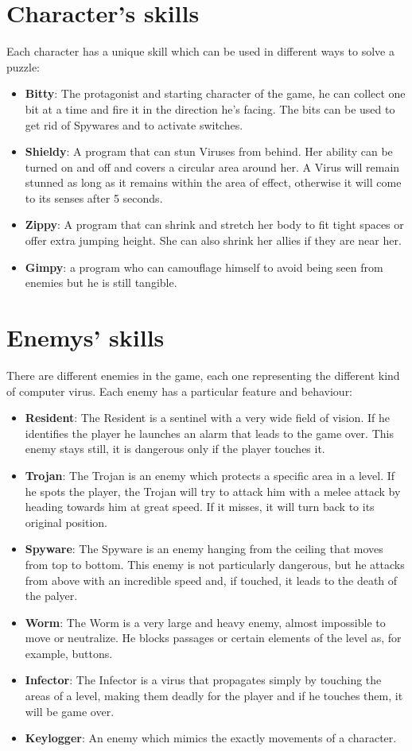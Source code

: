 \documentclass[12pt, a4paper]{report}
\begin{document}
\section*{Character’s skills}
Each character has a unique skill which can be used in different ways to solve a puzzle:
\begin{itemize}
	\item \textbf{Bitty}: The protagonist and starting character of the game, he can collect one bit at a time and fire it in the direction he’s facing. The bits can be used to get rid of Spywares and to activate switches.
	\item \textbf{Shieldy}: A program that can stun Viruses from behind. Her ability can be turned on and off and covers a circular area around her. A Virus will remain stunned as long as it remains within the area of effect, otherwise it will come to its senses after 5 seconds.
	\item \textbf{Zippy}: A program that can shrink and stretch her body to fit tight spaces or offer extra jumping height. She can also shrink her allies if they are near her.
	\item \textbf{Gimpy}: a program who can camouflage himself to avoid being seen from enemies but he is still tangible.
\end{itemize}

\section*{Enemys' skills}
There are different enemies in the game, each one representing the different kind of computer virus. Each enemy has a particular feature and behaviour:
\begin{itemize}
	\item \textbf{Resident}: The Resident is a sentinel with a very wide field of vision. If he identifies the player he launches an alarm that leads to the game 		over. This enemy stays still, it is dangerous only if the player touches it.
	\item \textbf{Trojan}: The Trojan is an enemy which protects a specific area in a level. If he spots the player, the Trojan will try to attack him with a 			melee attack by heading towards him at great speed. If it misses, it will turn back to its original position.
	\item \textbf{Spyware}: The Spyware is an enemy hanging from the ceiling that moves from top to bottom. This enemy is not particularly dangerous, but 	he attacks from above with an incredible speed and, if touched, it leads to the death of the palyer.
	\item \textbf{Worm}: The Worm is a very large and heavy enemy, almost impossible to move or neutralize. He blocks passages or certain elements of 		the level as, for example, buttons.
	\item \textbf{Infector}: The Infector is a virus that propagates simply by touching the areas of a level, making them deadly for the player and if he 			touches them, it will be game over.
	\item \textbf{Keylogger}: An enemy which mimics the exactly movements of a character.
\end{itemize}
\end{document}
